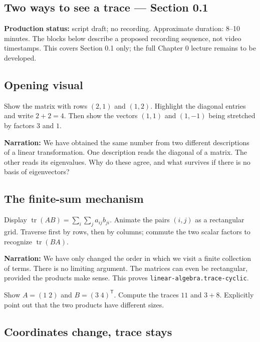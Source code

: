 \subsection{Two ways to see a trace --- Section 0.1}\label{two-ways-to-see-a-trace-section-0.1}

\textbf{Production status:} script draft; no recording. Approximate duration: 8--10 minutes. The blocks below describe a proposed recording sequence, not video timestamps. This covers Section 0.1 only; the full Chapter 0 lecture remains to be developed.

\subsection{Opening visual}\label{opening-visual}

Show the matrix with rows $(2,1)$ and $(1,2)$. Highlight the diagonal entries and write $2+2=4$. Then show the vectors $(1,1)$ and $(1,-1)$ being stretched by factors $3$ and $1$.

\textbf{Narration:} We have obtained the same number from two different descriptions of a linear transformation. One description reads the diagonal of a matrix. The other reads its eigenvalues. Why do these agree, and what survives if there is no basis of eigenvectors?

\subsection{The finite-sum mechanism}\label{the-finite-sum-mechanism}

Display $\operatorname{tr}(AB)=\sum_i\sum_j a_{ij}b_{ji}$. Animate the pairs $(i,j)$ as a rectangular grid. Traverse first by rows, then by columns; commute the two scalar factors to recognize $\operatorname{tr}(BA)$.

\textbf{Narration:} We have only changed the order in which we visit a finite collection of terms. There is no limiting argument. The matrices can even be rectangular, provided the products make sense. This proves \texttt{linear-algebra.trace-cyclic}.

Show $A=(1\;2)$ and $B=(3\;4)^{\mathsf{T}}$. Compute the traces $11$ and $3+8$. Explicitly point out that the two products have different sizes.

\subsection{Coordinates change, trace stays}\label{coordinates-change-trace-stays}

